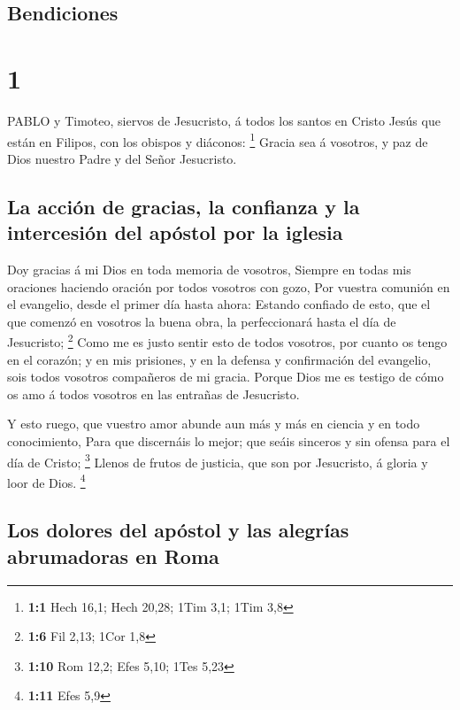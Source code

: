 \hypertarget{bendiciones}{%
\subsection{Bendiciones}\label{bendiciones}}

\hypertarget{section}{%
\section{1}\label{section}}

 PABLO y Timoteo, siervos de Jesucristo, á todos los santos
en Cristo Jesús que están en Filipos, con los obispos y diáconos:
\footnote{\textbf{1:1} Hech 16,1; Hech 20,28; 1Tim 3,1; 1Tim 3,8}
 Gracia sea á vosotros, y paz de Dios nuestro Padre y del
Señor Jesucristo.

\hypertarget{la-acciuxf3n-de-gracias-la-confianza-y-la-intercesiuxf3n-del-apuxf3stol-por-la-iglesia}{%
\subsection{La acción de gracias, la confianza y la intercesión del
apóstol por la
iglesia}\label{la-acciuxf3n-de-gracias-la-confianza-y-la-intercesiuxf3n-del-apuxf3stol-por-la-iglesia}}

 Doy gracias á mi Dios en toda memoria de vosotros,
 Siempre en todas mis oraciones haciendo oración por todos
vosotros con gozo,  Por vuestra comunión en el evangelio,
desde el primer día hasta ahora:  Estando confiado de esto,
que el que comenzó en vosotros la buena obra, la perfeccionará hasta el
día de Jesucristo; \footnote{\textbf{1:6} Fil 2,13; 1Cor 1,8}
 Como me es justo sentir esto de todos vosotros, por cuanto
os tengo en el corazón; y en mis prisiones, y en la defensa y
confirmación del evangelio, sois todos vosotros compañeros de mi gracia.
 Porque Dios me es testigo de cómo os amo á todos vosotros
en las entrañas de Jesucristo.

 Y esto ruego, que vuestro amor abunde aun más y más en
ciencia y en todo conocimiento,  Para que discernáis lo
mejor; que seáis sinceros y sin ofensa para el día de Cristo;
\footnote{\textbf{1:10} Rom 12,2; Efes 5,10; 1Tes 5,23} 
Llenos de frutos de justicia, que son por Jesucristo, á gloria y loor de
Dios. \footnote{\textbf{1:11} Efes 5,9}

\hypertarget{los-dolores-del-apuxf3stol-y-las-alegruxedas-abrumadoras-en-roma}{%
\subsection{Los dolores del apóstol y las alegrías abrumadoras en
Roma}\label{los-dolores-del-apuxf3stol-y-las-alegruxedas-abrumadoras-en-roma}}

